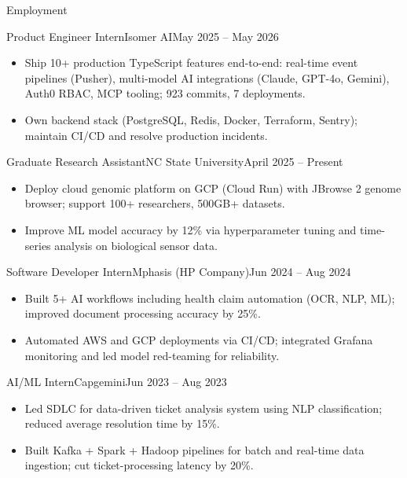 \documentclass[]{mcdowellcv}
\begin{document}
\makeheader

\begin{cvsection}{Employment}
  \begin{cvsubsection}{Product Engineer Intern}{Isomer AI}{May 2025 -- May 2026}
    \begin{itemize}
      \item Ship 10+ production TypeScript features end-to-end: real-time event pipelines (Pusher), multi-model AI integrations (Claude, GPT-4o, Gemini), Auth0 RBAC, MCP tooling; 923 commits, 7 deployments.
      \item Own backend stack (PostgreSQL, Redis, Docker, Terraform, Sentry); maintain CI/CD and resolve production incidents.
    \end{itemize}
    \vspace{-1.5pt}
  \end{cvsubsection}

  \begin{cvsubsection}{Graduate Research Assistant}{NC State University}{April 2025 -- Present}
    \begin{itemize}
      \item Deploy cloud genomic platform on GCP (Cloud Run) with JBrowse 2 genome browser; support 100+ researchers, 500GB+ datasets.
      \item Improve ML model accuracy by 12\% via hyperparameter tuning and time-series analysis on biological sensor data.
    \end{itemize}
    \vspace{-1.5pt}
  \end{cvsubsection}

  \begin{cvsubsection}{Software Developer Intern}{Mphasis (HP Company)}{Jun 2024 -- Aug 2024}
    \begin{itemize}
      \item Built 5+ AI workflows including health claim automation (OCR, NLP, ML); improved document processing accuracy by 25\%.
      \item Automated AWS and GCP deployments via CI/CD; integrated Grafana monitoring and led model red-teaming for reliability.
    \end{itemize}
    \vspace{-1.5pt}
  \end{cvsubsection}

  \begin{cvsubsection}{AI/ML Intern}{Capgemini}{Jun 2023 -- Aug 2023}
    \begin{itemize}
      \item Led SDLC for data-driven ticket analysis system using NLP classification; reduced average resolution time by 15\%.
      \item Built Kafka + Spark + Hadoop pipelines for batch and real-time data ingestion; cut ticket-processing latency by 20\%.
    \end{itemize}
    \vspace{-1.5pt}
  \end{cvsubsection}
\end{cvsection}
\end{document}
